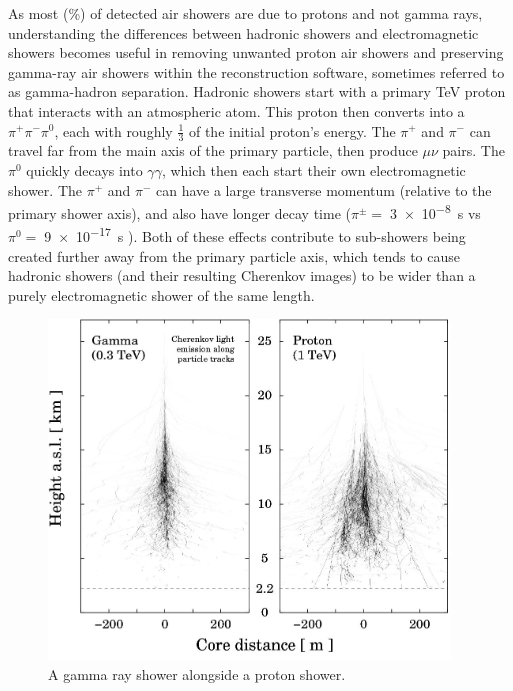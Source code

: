 As most (\%) of detected air showers are due to protons and not gamma rays, understanding the differences between hadronic showers and electromagnetic showers becomes useful in removing unwanted proton air showers and preserving gamma-ray air showers within the reconstruction software, sometimes referred to as gamma-hadron separation.
Hadronic showers start with a primary \nicetilde TeV proton that interacts with an atmospheric atom.
This proton then converts into a $\pi^{+}\pi^{-}\pi^{0}$, each with roughly \nicetilde $\frac{1}{3}$ of the initial proton's energy.
The $\pi^{+}$ and $\pi^{-}$ can travel far from the main axis of the primary particle, then produce $\mu\nu$ pairs.
The $\pi^{0}$ quickly decays into $\gamma\gamma$, which then each start their own electromagnetic shower.
The $\pi^{+}$ and $\pi^{-}$ can have a large transverse momentum (relative to the primary shower axis), and also have longer decay time ($\pi^{\pm}=\;$\SI{3e-8}{s} vs $\pi^{0}=\;$\SI{9e-17}{s} \cite{pdg_2014} ).
Both of these effects contribute to sub-showers being created further away from the primary particle axis, which tends to cause hadronic showers (and their resulting Cherenkov images) to be wider than a purely electromagnetic shower of the same length. 

\begin{figure}[ht]
  \centering
  \includegraphics[width=0.95\textwidth]{images/showers_gamma_proton}
  \caption[Gamma Ray and Proton Showers]{
    A gamma ray shower alongside a proton shower.\cite{Bernlohr2008149}
  }
  \label{fig:gamma_vs_proton_airshower}
\end{figure}


